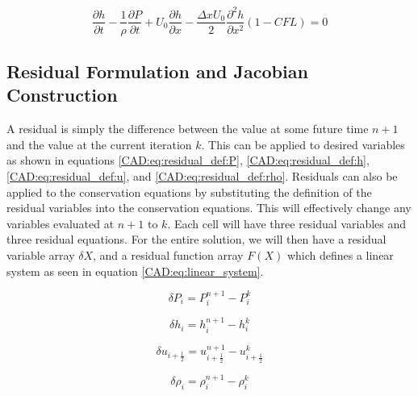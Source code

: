 \documentclass{mc2015}
\begin{document}
    \begin{equation}
    \label{CAD:eq:MEA_ene_result}
    	\frac{\partial h}{\partial t} - \frac{1}{\rho} \frac{\partial P}{\partial t} +
    	U_{0} \frac{\partial h}{\partial x} - 
    	\frac{\Delta x U_{0}}{2} \frac{\partial^2 h}{\partial x^2}
    	\left( 1 - CFL \right)
    	= 0
    \end{equation}

\subsection{Residual Formulation and Jacobian Construction}

	A residual is simply the difference between the value at some future time
    $n+1$ and the value at the current iteration $k$. This can be applied to
    desired variables as shown in equations
    \eqref{CAD:eq:residual_def:P}, \eqref{CAD:eq:residual_def:h},
    \eqref{CAD:eq:residual_def:u}, and \eqref{CAD:eq:residual_def:rho}. Residuals can
    also be applied to the conservation equations by substituting the definition
    of the residual variables into the conservation equations. This will
    effectively change any variables evaluated at $n+1$ to $k$. Each cell will
    have three residual variables and three residual equations. For the entire
    solution, we will then have a residual variable array $\delta X$, and a
    residual function array $F(X)$ which defines a linear system as seen in 
    equation \eqref{CAD:eq:linear_system}.
        
    \begin{equation}
    	\label{CAD:eq:residual_def:P}
    	\delta P_{i} = P^{n+1}_{i} - P^{k}_{i}
    \end{equation}
    
    \begin{equation}
    	\label{CAD:eq:residual_def:h}
    	\delta h_{i} = h^{n+1}_{i} - h^{k}_{i}
    \end{equation}
    
    \begin{equation}
    	\label{CAD:eq:residual_def:u}
    	\delta u_{i+\frac{1}{2}} = u^{n+1}_{i+\frac{1}{2}} - u^{k}_{i+\frac{1}{2}}
    \end{equation}
    
    \begin{equation}
    	\label{CAD:eq:residual_def:rho}
    	\delta \rho_{i} = \rho^{n+1}_{i} - \rho^{k}_{i}
    \end{equation}
    
\end{document}
